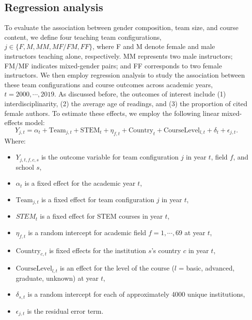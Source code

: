 \documentclass[
  11pt,
]{article}
\begin{document}
\subsection{Regression analysis}\label{regression-analysis}

To evaluate the association between gender composition, team size, and course content, we define four teaching team configurations, \(j\in \{F, M, MM, MF/FM, FF\}\), where F and M denote female and male instructors teaching alone, respectively. MM represents two male instructors; FM/MF indicates mixed-gender pairs; and FF corresponds to two female instructors. We then employ regression analysis to study the association between these team configurations and course outcomes across academic years, \(t = 2000, \cdots, 2019\). As discussed before, the outcomes of interest include (1) interdisciplinarity, (2) the average age of readings, and (3) the proportion of cited female authors. To estimate these effects, we employ the following linear mixed-effects model:
\[
Y_{j, t} = 
 \alpha_t + 
 \text{Team}_{j, t} + 
 \text{STEM}_t + \eta_{f,t} +  %
 \text{Country}_{t} + 
 \text{CourseLevel}_{l,t} + 
 \delta_{t} + 
 \epsilon_{j, t}.
\]
Where:

\begin{itemize}
\item
  \(Y_{j, t, f, c, s}\) is the outcome variable for team configuration \(j\) in year \(t\), field \(f\), and school \(s\),
\item
  \(\alpha_{t}\) is a fixed effect for the academic year \(t\),
\item
  \(\text{Team}_{j, t}\) is a fixed effect for team configuration \(j\) in year \(t\),
\item
  \(STEM_{t}\) is a fixed effect for STEM courses in year \(t\),
\item
  \(\eta_{f,t}\) is a random intercept for academic field \(f = 1,\cdots, 69\) at year \(t\),
\item
  \(\text{Country}_{c, t}\) is fixed effects for the institution \(s\)'s country \(c\) in year \(t\),
\item
  \(\text{CourseLevel}_{l, t}\) is an effect for the level of the course (\(l\) = basic, advanced, graduate, unknown) at year \(t\),
\item
  \(\delta_{s, t}\) is a random intercept for each of approximately 4000 unique institutions,
\item
  \(\epsilon_{j,t}\) is the residual error term.
\end{itemize}
\end{document}

